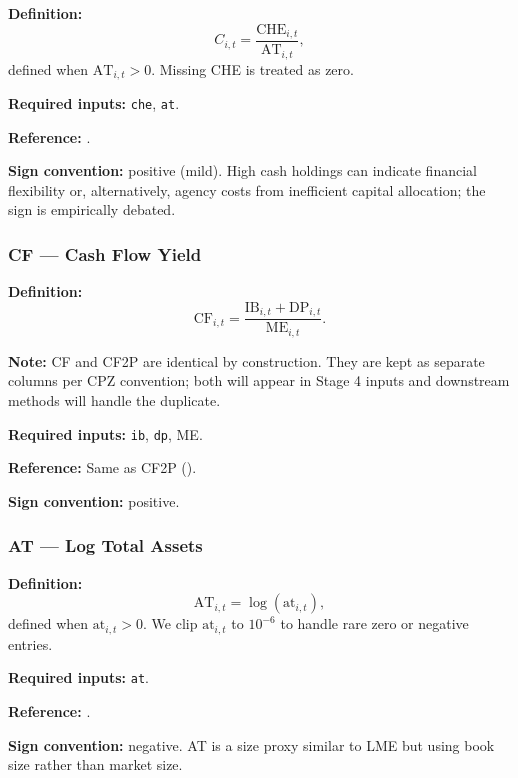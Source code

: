 \textbf{Definition:}
\begin{equation}
C_{i,t} = \frac{\mathrm{CHE}_{i,t}}{\mathrm{AT}_{i,t}},
\label{eq:c}
\end{equation}
defined when $\mathrm{AT}_{i,t} > 0$. Missing CHE is treated as zero.

\textbf{Required inputs:} \texttt{che}, \texttt{at}.

\textbf{Reference:} \cite{Palazzo2012}.

\textbf{Sign convention:} positive (mild). High cash holdings can
indicate financial flexibility or, alternatively, agency costs from
inefficient capital allocation; the sign is empirically debated.

\subsubsection{CF --- Cash Flow Yield}

\textbf{Definition:}
\begin{equation}
\mathrm{CF}_{i,t} = \frac{\mathrm{IB}_{i,t} + \mathrm{DP}_{i,t}}
                          {\mathrm{ME}_{i,t}}.
\label{eq:cf}
\end{equation}

\textbf{Note:} CF and CF2P are identical by construction. They are kept
as separate columns per CPZ convention; both will appear in Stage 4
inputs and downstream methods will handle the duplicate.

\textbf{Required inputs:} \texttt{ib}, \texttt{dp}, ME.

\textbf{Reference:} Same as CF2P (\cite{Lakonishok1994}).

\textbf{Sign convention:} positive.

\subsubsection{AT --- Log Total Assets}

\textbf{Definition:}
\begin{equation}
\mathrm{AT}_{i,t} = \log(\mathrm{at}_{i,t}),
\label{eq:log-at}
\end{equation}
defined when $\mathrm{at}_{i,t} > 0$. We clip $\mathrm{at}_{i,t}$ to
$10^{-6}$ to handle rare zero or negative entries.

\textbf{Required inputs:} \texttt{at}.

\textbf{Reference:} \cite{FreybergerNeuhierlWeber2020}.

\textbf{Sign convention:} negative. AT is a size proxy similar to LME
but using book size rather than market size.

